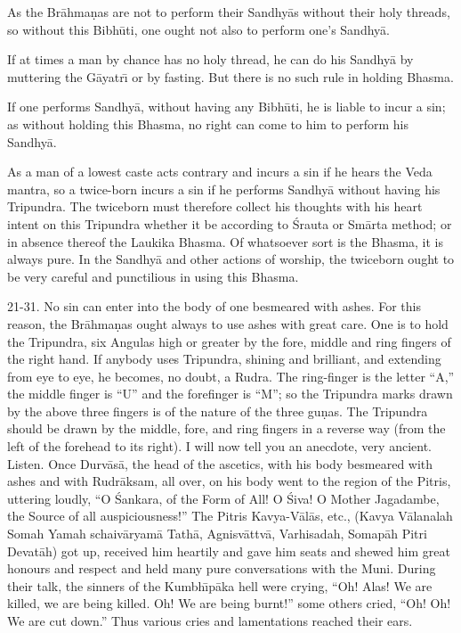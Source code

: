 As the Br\=ahma\d{n}as are not to perform their Sandhy\=as without their holy threads, so without this Bibh\=uti, one ought not also to perform one's Sandhy\=a.

If at times a man by chance has no holy thread, he can do his Sandhy\=a by muttering the G\=ayatr\={\i} or by fasting. But there is no such rule in holding Bhasma.

If one performs Sandhy\=a, without having any Bibh\=uti, he is liable to incur a sin; as without holding this Bhasma, no right can come to him to perform his Sandhy\=a.

As a man of a lowest caste acts contrary and incurs a sin if he hears the Veda mantra, so a twice-born incurs a sin if he performs Sandhy\=a without having his Tripundra. The twiceborn must therefore collect his thoughts with his heart intent on this Tripundra whether it be according to \'Srauta or Sm\=arta method; or in absence thereof the Laukika Bhasma. Of whatsoever sort is the Bhasma, it is always pure. In the Sandhy\=a and other actions of worship, the twiceborn ought to be very careful and punctilious in using this Bhasma.

21-31. No sin can enter into the body of one besmeared with ashes. For this reason, the Br\=ahma\d{n}as ought always to use ashes with great care. One is to hold the Tripundra, six Angulas high or greater by the fore, middle and ring fingers of the right hand. If anybody uses Tripundra, shining and brilliant, and extending from eye to eye, he becomes, no doubt, a Rudra. The ring-finger is the letter ``A,'' the middle finger is ``U'' and the forefinger is ``M''; so the Tripundra marks drawn by the above three fingers is of the nature of the three gu\d{n}as. The Tripundra should be drawn by the middle, fore, and ring fingers in a reverse way (from the left of the forehead to its right). I will now tell you an anecdote, very ancient. Listen. Once Durv\=as\=a, the head of the ascetics, with his body besmeared with ashes and with Rudr\=aksam, all over, on his body went to the region of the Pitris, uttering loudly, ``O \'Sankara, of the Form of All! O \'Siva! O Mother Jagadambe, the Source of all auspiciousness!'' The Pitris Kavya-V\=al\=as, etc., (Kavya V\=alanalah Somah Yamah schaiv\=aryam\=a Tath\=a, Agnisv\=attv\=a, Varhisadah, Somap\=ah Pitri Devat\=ah) got up, received him heartily and gave him seats and shewed him great honours and respect and held many pure conversations with the Muni. During their talk, the sinners of the Kumbh\={\i}p\=aka hell were crying, ``Oh! Alas! We are killed, we are being killed. Oh! We are being burnt!'' some others cried, ``Oh! Oh! We are cut down.'' Thus various cries and lamentations reached their ears.

